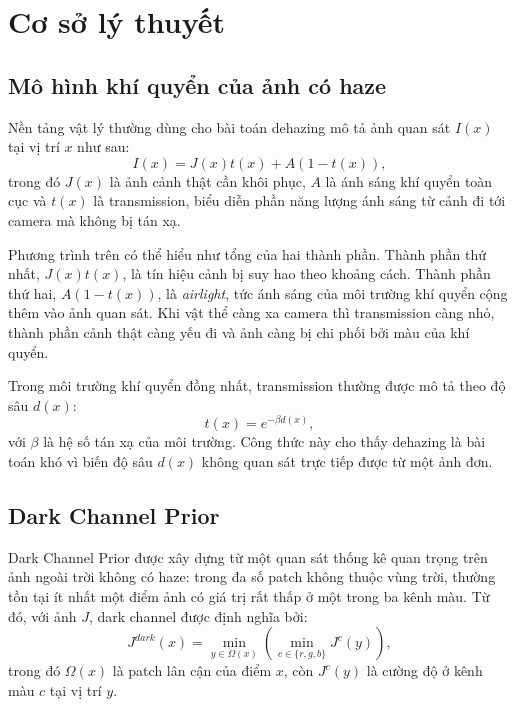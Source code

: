 \newpage
\section{Cơ sở lý thuyết}

\subsection{Mô hình khí quyển của ảnh có haze}

Nền tảng vật lý thường dùng cho bài toán dehazing mô tả ảnh quan sát \(I(x)\) tại vị trí \(x\) như sau:
\begin{equation}
I(x) = J(x)t(x) + A\left(1 - t(x)\right),
\end{equation}
trong đó \(J(x)\) là ảnh cảnh thật cần khôi phục, \(A\) là ánh sáng khí quyển toàn cục và \(t(x)\) là transmission, biểu diễn phần năng lượng ánh sáng từ cảnh đi tới camera mà không bị tán xạ.

Phương trình trên có thể hiểu như tổng của hai thành phần. Thành phần thứ nhất, \(J(x)t(x)\), là tín hiệu cảnh bị suy hao theo khoảng cách. Thành phần thứ hai, \(A(1 - t(x))\), là \textit{airlight}, tức ánh sáng của môi trường khí quyển cộng thêm vào ảnh quan sát. Khi vật thể càng xa camera thì transmission càng nhỏ, thành phần cảnh thật càng yếu đi và ảnh càng bị chi phối bởi màu của khí quyển.

Trong môi trường khí quyển đồng nhất, transmission thường được mô tả theo độ sâu \(d(x)\):
\begin{equation}
t(x) = e^{-\beta d(x)},
\end{equation}
với \(\beta\) là hệ số tán xạ của môi trường. Công thức này cho thấy dehazing là bài toán khó vì biến độ sâu \(d(x)\) không quan sát trực tiếp được từ một ảnh đơn.

\subsection{Dark Channel Prior}

Dark Channel Prior được xây dựng từ một quan sát thống kê quan trọng trên ảnh ngoài trời không có haze: trong đa số patch không thuộc vùng trời, thường tồn tại ít nhất một điểm ảnh có giá trị rất thấp ở một trong ba kênh màu. Từ đó, với ảnh \(J\), dark channel được định nghĩa bởi:
\begin{equation}
J^{dark}(x) = \min_{y \in \Omega(x)} \left( \min_{c \in \{r,g,b\}} J^c(y) \right),
\end{equation}
trong đó \(\Omega(x)\) là patch lân cận của điểm \(x\), còn \(J^c(y)\) là cường độ ở kênh màu \(c\) tại vị trí \(y\).

